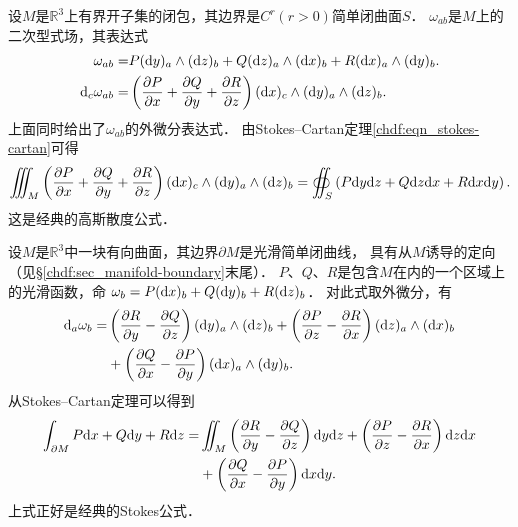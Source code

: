 \begin{example}
    设$M$是$\mathbb{R}^3$上有界开子集的闭包，其边界是$C^r(r>0)$简单闭曲面$S$．
    $\omega_{ab}$是$M$上的二次型式场，其表达式
    \begin{align}
       \omega_{ab} =& P({\rm d}y)_a\wedge ({\rm d}z)_b +
          Q({\rm d}z)_a\wedge ({\rm d}x)_b+ R({\rm d}x)_a\wedge ({\rm d}y)_b . \\
       {\rm d}_c\omega_{ab} =& \left(\frac{\partial P}{\partial x}
        + \frac{\partial Q}{\partial y} +\frac{\partial R}{\partial z} \right)
       ({\rm d}x)_c\wedge ({\rm d}y)_a\wedge ({\rm d}z)_b  .
    \end{align}
    上面同时给出了$\omega_{ab}$的外微分表达式．
    由Stokes--Cartan定理\eqref{chdf:eqn_stokes-cartan}可得
    \begin{equation*}
        \iiint_{M} \left(\frac{\partial P}{\partial x}
        + \frac{\partial Q}{\partial y} +\frac{\partial R}{\partial z} \right)
        ({\rm d}x)_c\wedge ({\rm d}y)_a\wedge ({\rm d}z)_b
        =  \oiint_{S} \left(P {\rm d}y {\rm d}z +
        Q {\rm d}z {\rm d}x + R {\rm d}x {\rm d}y \right).
    \end{equation*}
    这是经典的高斯散度公式． 
\end{example}

\begin{example}
    设$M$是$\mathbb{R}^3$中一块有向曲面，其边界$\partial M$是光滑简单闭曲线，
    具有从$M$诱导的定向（见\S\ref{chdf:sec_manifold-boundary}末尾）．
    $P$、$Q$、$R$是包含$M$在内的一个区域上的光滑函数，命
    $ \omega_b= P({\rm d}x)_b+  Q({\rm d}y)_b + R({\rm d}z)_b $．
    对此式取外微分，有
    \begin{align*}
        {\rm d}_a\omega_{b} = &
        \left(\frac{\partial R}{\partial y}-\frac{\partial Q}{\partial z}\right) ({\rm d}y)_a\wedge ({\rm d}z)_b +
        \left(\frac{\partial P}{\partial z}-\frac{\partial R}{\partial x}\right) ({\rm d}z)_a\wedge ({\rm d}x)_b \\
        &+ \left(\frac{\partial Q}{\partial x}-\frac{\partial P}{\partial y}\right) ({\rm d}x)_a\wedge ({\rm d}y)_b .
    \end{align*}
    从Stokes--Cartan定理可以得到
    \begin{align*}
        \int_{\partial M} P{\rm d}x+  Q{\rm d}y + R{\rm d}z =  &    \iint_{M} 
        \left(\frac{\partial R}{\partial y}-\frac{\partial Q}{\partial z}\right) {\rm d}y {\rm d}z +
        \left(\frac{\partial P}{\partial z}-\frac{\partial R}{\partial x}\right) {\rm d}z {\rm d}x \\
        &+\left(\frac{\partial Q}{\partial x}-\frac{\partial P}{\partial y}\right) {\rm d}x {\rm d}y .
    \end{align*} %
    上式正好是经典的Stokes公式． 
\end{example}


